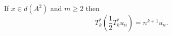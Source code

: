 If $x \in d(A^2)$ and $m \geq 2$ then
$$T_k^* \left( \frac{1}{2} T_k^* u_n \right) = n^{k+1} u_n.$$
